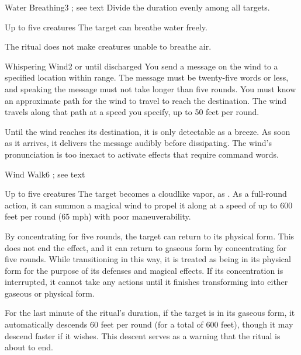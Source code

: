 \begin{spellsection}{Water Breathing}{3}
\spelldur \durext \dismissable; see text
\spellspecial Divide the duration evenly among all targets.
\begin{spelltargets}{Up to five creatures}
    \spelleffect The target can breathe water freely. 
\end{spelltargets}
\spellnotes The ritual does not make creatures unable to breathe air.
\end{spellsection}

\begin{spellsection}{Whispering Wind}{2}
\spelldur \durext or until discharged
\spelleffect You send a message on the wind to a specified location within range. The message must be twenty-five words or less, and speaking the message must not take longer than five rounds. You must know an approximate path for the wind to travel to reach the destination. The wind travels along that path at a speed you specify, up to 50 feet per round.

Until the wind reaches its destination, it is only detectable as a breeze. As soon as it arrives, it delivers the message audibly before dissipating.
\spellnotes The wind's pronunciation is too inexact to activate effects that require command words.
\end{spellsection}

\begin{spellsection}{Wind Walk}{6}
\spelldur \durext \dismissable; see text
\begin{spelltargets}{Up to five creatures}
    \spelleffect The target becomes a cloudlike vapor, as . As a full-round action, it can summon a magical wind to propel it along at a speed of up to 600 feet per round (65 mph) with poor maneuverability.

    By concentrating for five rounds, the target can return to its physical form. This does not end the effect, and it can return to gaseous form by concentrating for five rounds. While transitioning in this way, it is treated as being in its physical form for the purpose of its defenses and magical effects. If its concentration is interrupted, it cannot take any actions until it finishes transforming into either gaseous or physical form.

For the last minute of the ritual's duration, if the target is in its gaseous form, it automatically descends 60 feet per round (for a total of 600 feet), though it may descend faster if it wishes. This descent serves as a warning that the ritual is about to end.
\end{spelltargets}
\end{spellsection}

